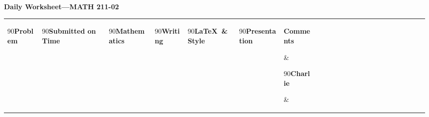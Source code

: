 \documentclass[landscape]{article}
\begin{document}
\thispagestyle{empty}

\begin{center}
    \Large\textbf{Daily Worksheet—MATH 211-02}
\end{center}

\vspace{.25cm}

\setlength{\tabcolsep}{4pt}
\renewcommand{\arraystretch}{1.5}

\noindent
\begin{tabular}{|
>{\centering\arraybackslash}m{1.5 cm}|
>{\centering\arraybackslash}m{0.35cm}|
>{\centering\arraybackslash}m{0.35cm}|
>{\centering\arraybackslash}m{0.35cm}|
>{\centering\arraybackslash}m{0.35cm}|
>{\centering\arraybackslash}m{0.35cm}|
>{\arraybackslash}m{9.5cm}|
>{\centering\arraybackslash}m{0.35cm}|%
>{\centering\arraybackslash}m{0.35cm}|%
>{\centering\arraybackslash}m{0.35cm}|%
>{\centering\arraybackslash}m{0.35cm}|%
>{\centering\arraybackslash}m{0.35cm}|%
>{\centering\arraybackslash}m{0.35cm}|%
>{\centering\arraybackslash}m{0.35cm}|%
>{\centering\arraybackslash}m{0.35cm}|%
>{\centering\arraybackslash}m{0.35cm}|%
>{\centering\arraybackslash}m{0.35cm}|%
>{\centering\arraybackslash}m{0.35cm}|%
>{\centering\arraybackslash}m{0.35cm}|%
>{\centering\arraybackslash}m{0.35cm}|%
>{\centering\arraybackslash}m{0.35cm}|%
>{\centering\arraybackslash}m{0.35cm}|%
>{\centering\arraybackslash}m{0.35cm}|%
}
\hline
\multicolumn{7}{|c|}{\textbf{Presenters}} & \multicolumn{16}{c|}{\textbf{Contributors}} \\
\hline
\begin{turn}{90}\textbf{Problem}\end{turn} &
\begin{turn}{90}\textbf{Submitted on Time ~}\end{turn} &
\begin{turn}{90}\textbf{Mathematics}\end{turn} &
\begin{turn}{90}\textbf{Writing}\end{turn} &
\begin{turn}{90}\textbf{\LaTeX\ \& Style}\end{turn} &
\begin{turn}{90}\textbf{Presentation}\end{turn} &
\parbox[c][1.5cm][c]{8cm}{\centering\textbf{Comments}} &
\begin{turn}{90}\textbf{Charlie}\end{turn} &

\end{tabular}
\end{document}
